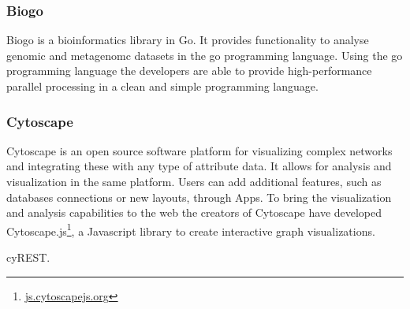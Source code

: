 
\subsubsection*{Biogo} 
Biogo is a bioinformatics library in Go. It provides functionality to analyse
genomic and metagenomc datasets in the go programming
language.\cite{Kortschak005033} Using the go programming language the developers
are able to provide high-performance parallel processing in a clean and simple
programming language. 

\subsubsection*{Cytoscape} 
Cytoscape is an open source software platform for visualizing complex
networks and integrating these with any type of attribute
data\cite{shannon2003cytoscape}. It allows for analysis and visualization in the
same platform. Users can add additional features, such as databases connections
or new layouts, through Apps. To bring the visualization and analysis
capabilities to the web the creators of Cytoscape have developed
Cytoscape.js\footnote{\url{js.cytoscapejs.org}}, a Javascript library to create
interactive graph visualizations. 

cyREST. 



